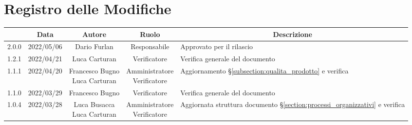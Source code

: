 \thispagestyle{empty}
\section*{Registro delle Modifiche}

\begin{center}
	\renewcommand{\arraystretch}{1.8}
	\begin{longtable}[c]{c | c | c | c | p{5cm}}
		\rowcolor[HTML]{125E28}
		\multicolumn{1}{c}{\color[HTML]{FFFFFF} \textbf{Versione}} &
		\multicolumn{1}{c}{\color[HTML]{FFFFFF} \textbf{Data}}     &
		\multicolumn{1}{c}{\color[HTML]{FFFFFF} \textbf{Autore}}   &
		\multicolumn{1}{c}{\color[HTML]{FFFFFF} \textbf{Ruolo}}    &
		\multicolumn{1}{c}{\color[HTML]{FFFFFF} \textbf{Descrizione}}                                                                                                                                                                                                               \\
		\endhead
		2.0.0                                                      & 2022/05/06 & Dario Furlan                         & Responsabile   & Approvato per il rilascio                                                                                                                 \\
		1.2.1                                                      & 2022/04/21 & Luca Carturan                        & Verificatore   & Verifica generale del documento                                                                                                           \\
		1.1.1                                                      & 2022/04/20 & \Longunderstack{Francesco Bugno                                                                                                                                                                   \\Luca Carturan} & \Longunderstack{Amministratore\\Verificatore} & Aggiornamento §\ref{subsection:qualita_prodotto} e verifica\\
		1.1.0                                                      & 2022/03/29 & Francesco Bugno                      & Verificatore   & Verifica generale del documento                                                                                                           \\
		1.0.4                                                      & 2022/03/28 & \Longunderstack{Luca Busacca                                                                                                                                                                      \\Luca Carturan} & \Longunderstack{Amministratore\\Verificatore} & Aggiornata struttura documento §\ref{section:processi_organizzativi} e verifica\\

\end{longtable}
\end{center}
